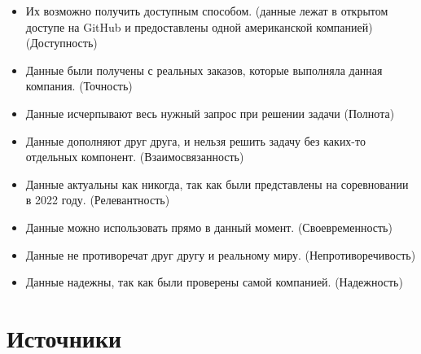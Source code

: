 \documentclass{article}
\begin{document}
\begin{itemize}
    \item Их возможно получить доступным способом. (данные лежат в открытом доступе на GitHub и предоставлены одной американской компанией) (Доступность)
    \item Данные были получены с реальных заказов, которые выполняла данная компания. (Точность)
    \item Данные исчерпывают весь нужный запрос при решении задачи (Полнота)
    \item Данные дополняют друг друга, и нельзя решить задачу без каких-то отдельных компонент. (Взаимосвязанность)
    \item Данные актуальны как никогда, так как были представлены на соревновании в 2022 году. (Релевантность)
    \item Данные можно использовать прямо в данный момент. (Своевременность)
    \item Данные не противоречат друг другу и реальному миру. (Непротиворечивость)
    \item Данные надежны, так как были проверены самой компанией. (Надежность)
\end{itemize}

\newpage

\section{Источники}
\end{document}
